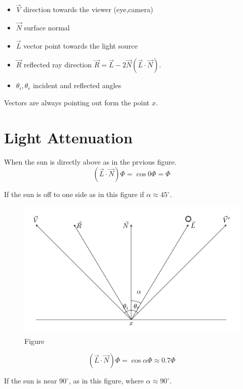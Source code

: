\documentclass[
]{book}
\providecommand{\tightlist}{%
  \setlength{\itemsep}{0pt}\setlength{\parskip}{0pt}}
\begin{document}
\begin{itemize}
\tightlist
\item
  \(\vec{V}\) direction towards the viewer (eye,camera)
\item
  \(\vec{N}\) surface normal
\item
  \(\vec{L}\) vector point towards the light source
\item
  \(\vec{R}\) reflected ray direction
  \(\vec{R}=\vec{L}-2\vec{N}\left(\vec{L}\cdot\vec{N}\right)\).
\item
  \(\theta_i,\theta_r\) incident and reflected angles
\end{itemize}

Vectors are always pointing out form the point \(x\).

\hypertarget{light-attenuation}{%
\section{Light Attenuation}\label{light-attenuation}}

When the sun is directly above as in the prvious figure.
\[
\left(\vec{L}\cdot\vec{N}\right)\Phi=\cos0\Phi=\Phi
\]

If the sun is off to one side as in this figure if \(\alpha\approx45^\circ\).

\begin{figure}
\centering
\includegraphics{figures/02_2.png}
\caption{Figure}
\end{figure}

\[
\left(\vec{L}\cdot\vec{N}\right)\Phi=\cos\alpha\Phi\approx 0.7\Phi
\]

If the sun is near \(90^\circ\), as in this figure, where
\(\alpha\approx90^\circ\).
\end{document}
